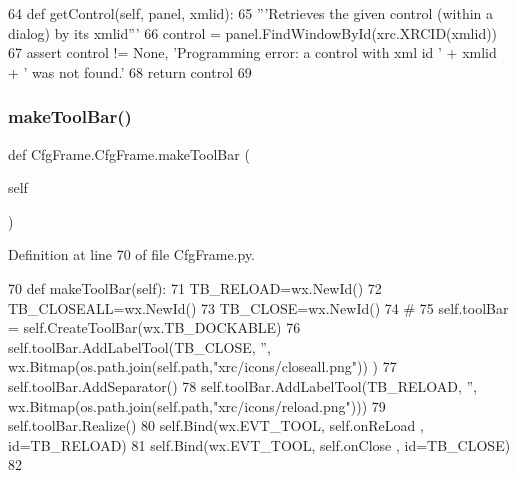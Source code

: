 \begin{DoxyCode}
64     \textcolor{keyword}{def }getControl(self, panel, xmlid):
65         \textcolor{stringliteral}{'''Retrieves the given control (within a dialog) by its xmlid'''}
66         control = panel.FindWindowById(xrc.XRCID(xmlid))
67         \textcolor{keyword}{assert} control != \textcolor{keywordtype}{None}, \textcolor{stringliteral}{'Programming error: a control with xml id '} + xmlid + \textcolor{stringliteral}{' was not found.'}
68         \textcolor{keywordflow}{return} control
69         
\end{DoxyCode}
\mbox{\label{classCfgFrame_1_1CfgFrame_ae2d9110db5110fd1ca709e62e252a272}} 
\subsubsection{\texorpdfstring{make\+Tool\+Bar()}{makeToolBar()}}
{\footnotesize\ttfamily def Cfg\+Frame.\+Cfg\+Frame.\+make\+Tool\+Bar (\begin{DoxyParamCaption}\item[{}]{self }\end{DoxyParamCaption})}



Definition at line 70 of file Cfg\+Frame.\+py.


\begin{DoxyCode}
70     \textcolor{keyword}{def }makeToolBar(self):
71         TB\_RELOAD=wx.NewId()
72         TB\_CLOSEALL=wx.NewId()
73         TB\_CLOSE=wx.NewId()
74         \textcolor{comment}{#}
75         self.toolBar = self.CreateToolBar(wx.TB\_DOCKABLE)
76         self.toolBar.AddLabelTool(TB\_CLOSE, \textcolor{stringliteral}{''}, wx.Bitmap(os.path.join(self.path,\textcolor{stringliteral}{"xrc/icons/closeall.png"}))
      )
77         self.toolBar.AddSeparator()        
78         self.toolBar.AddLabelTool(TB\_RELOAD, \textcolor{stringliteral}{''}, wx.Bitmap(os.path.join(self.path,\textcolor{stringliteral}{"xrc/icons/reload.png"})))
79         self.toolBar.Realize()
80         self.Bind(wx.EVT\_TOOL, self.onReLoad , id=TB\_RELOAD)
81         self.Bind(wx.EVT\_TOOL, self.onClose , id=TB\_CLOSE)
82 
\end{DoxyCode}
\mbox{\label{classCfgFrame_1_1CfgFrame_afa122f42de17c4e6685cec02376c11af}} 
